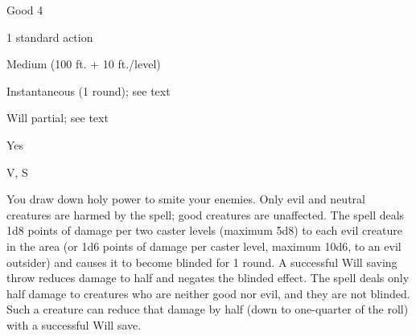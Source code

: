 
\begin{description*}
\item[Level:] Good 4
\item[Casting Time:] 1 standard action
\item[Range:] Medium (100 ft. + 10 ft./level)
\item[Duration:] Instantaneous (1 round); see text
\item[Saving Throw:] Will partial; see text
\item[Spell Resistance:] Yes
\item[Components:] V, S
\end{description*}

You draw down holy power to smite your enemies. Only evil and neutral creatures
are harmed by the spell; good creatures are unaffected.
The spell deals 1d8 points of damage per two caster levels (maximum 5d8) to each
evil creature in the area (or 1d6 points of damage per caster level, maximum 10d6,
to an evil outsider) and causes it to become blinded for 1 round. A successful
Will saving throw reduces damage to half and negates the blinded effect.
The spell deals only half damage to creatures who are neither good nor evil, and
they are not blinded. Such a creature can reduce that damage by half (down to one-quarter
of the roll) with a successful Will save.
